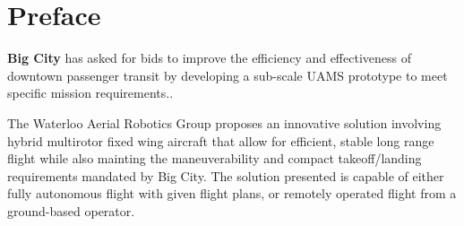 \documentclass[12pt]{report}
\begin{document}
	




\delivResponsible{} 






\istChange{}{}{}{}


\makecover


\clearpage
{}

\settableofcontents

\selectfont

\section{Preface}

\textbf{Big City} has asked for bids to improve the efficiency and
effectiveness of downtown passenger transit by developing a sub-scale UAMS
prototype to meet specific mission requirements..

The Waterloo Aerial Robotics Group proposes an innovative solution involving
hybrid multirotor fixed wing aircraft that allow for efficient, stable long
range flight while also mainting the maneuverability and compact
takeoff/landing requirements mandated by Big City. The solution presented is
capable of either fully autonomous flight with given flight plans, or remotely
operated flight from a ground-based operator. 
\end{document}
